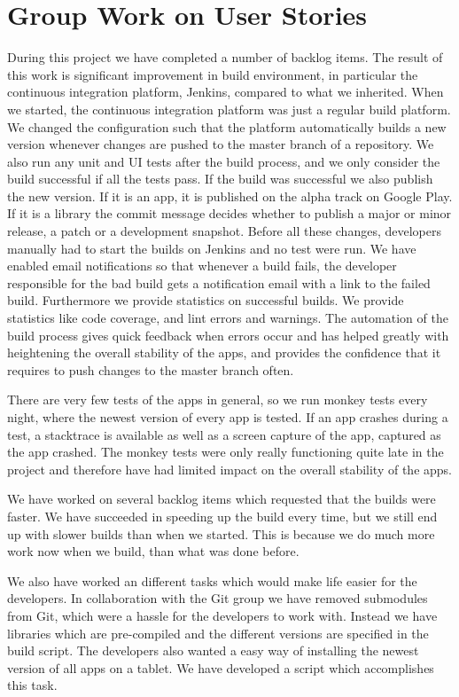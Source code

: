 \section{Group Work on User Stories}\label{conc:userstories}
During this project we have completed a number of backlog items. The result of this work is significant improvement in build environment, in particular the continuous integration platform, Jenkins, compared to what we inherited. When we started, the continuous integration platform was just a regular build platform. We changed the configuration such that the platform automatically builds a new version whenever changes are pushed to the master branch of a repository. We also run any unit and UI tests after the build process, and we only consider the build successful if all the tests pass. If the build was successful we also publish the new version. If it is an app, it is published on the alpha track on Google Play. If it is a library the commit message decides whether to publish a major or minor release, a patch or a development snapshot. Before all these changes, developers manually had to start the builds on Jenkins and no test were run. We have enabled email notifications so that whenever a build fails, the developer responsible for the bad build gets a notification email with a link to the failed build. Furthermore we provide statistics on successful builds. We provide statistics like code coverage, and lint errors and warnings. The automation of the build process gives quick feedback when errors occur and has helped greatly with heightening the overall stability of the apps, and provides the confidence that it requires to push changes to the master branch often.

There are very few tests of the apps in general, so we run monkey tests every night, where the newest version of every app is tested. If an app crashes during a test, a stacktrace is available as well as a screen capture of the app, captured as the app crashed. The monkey tests were only really functioning quite late in the project and therefore have had limited impact on the overall stability of the apps.

We have worked on several backlog items which requested that the builds were faster. We have succeeded in speeding up the build every time, but we still end up with slower builds than when we started. This is because we do much more work now when we build, than what was done before.

We also have worked an different tasks which would make life easier for the developers. In collaboration with the Git group we have removed submodules from Git, which were a hassle for the developers to work with. Instead we have libraries which are pre-compiled and the different versions are specified in the build script. The developers also wanted a easy way of installing the newest version of all apps on a tablet. We have developed a script which accomplishes this task.

